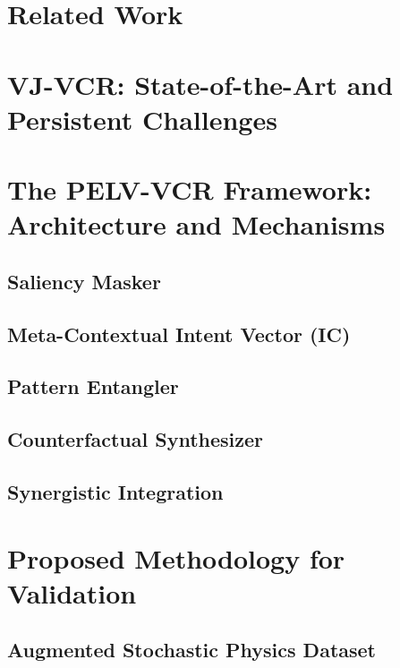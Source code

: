 \documentclass[11pt]{article}
\begin{document}
\section{Related Work}

\section{VJ-VCR: State-of-the-Art and Persistent Challenges}

\section{The PELV-VCR Framework: Architecture and Mechanisms}
\subsection{Saliency Masker}
\subsection{Meta-Contextual Intent Vector (IC)}
\subsection{Pattern Entangler}
\subsection{Counterfactual Synthesizer}
\subsection{Synergistic Integration}

\section{Proposed Methodology for Validation}
\subsection{Augmented Stochastic Physics Dataset}
\end{document}
